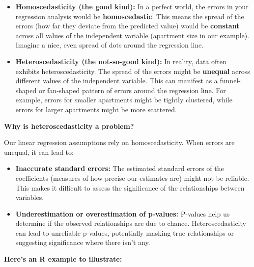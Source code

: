 \documentclass[
  letterpaper,
  paper =a4,
  twoside,
  openright,
  headsepline,
  footsepline,
  listof = totocnumbered,
  chapterprefix = true,
  firstiscover,
  parskip = full*]{scrbook}
\begin{document}
\begin{itemize}
\item
  \textbf{Homoscedasticity (the good kind):} In a perfect world, the
  errors in your regression analysis would be \textbf{homoscedastic}.
  This means the spread of the errors (how far they deviate from the
  predicted value) would be \textbf{constant} across all values of the
  independent variable (apartment size in our example). Imagine a nice,
  even spread of dots around the regression line.
\item
  \textbf{Heteroscedasticity (the not-so-good kind):} In reality, data
  often exhibits heteroscedasticity. The spread of the errors might be
  \textbf{unequal} across different values of the independent variable.
  This can manifest as a funnel-shaped or fan-shaped pattern of errors
  around the regression line. For example, errors for smaller apartments
  might be tightly clustered, while errors for larger apartments might
  be more scattered.
\end{itemize}

\textbf{Why is heteroscedasticity a problem?}

Our linear regression assumptions rely on homoscedasticity. When errors
are unequal, it can lead to:

\begin{itemize}
\item
  \textbf{Inaccurate standard errors:} The estimated standard errors of
  the coefficients (measures of how precise our estimates are) might not
  be reliable. This makes it difficult to assess the significance of the
  relationships between variables.
\item
  \textbf{Underestimation or overestimation of p-values:} P-values help
  us determine if the observed relationships are due to chance.
  Heteroscedasticity can lead to unreliable p-values, potentially
  masking true relationships or suggesting significance where there
  isn't any.
\end{itemize}

\textbf{Here's an R example to illustrate:}
\end{document}
